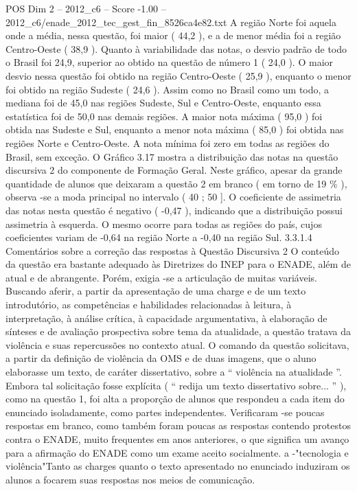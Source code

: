 \begin{textsample}{POS Dim 2 – 2012\_c6 – Score -1.00 – 2012\_c6/enade\_2012\_tec\_gest\_fin\_8526ca4e82.txt}
A região Norte foi aquela onde a média, nessa questão, foi maior ( 44,2 ), e a de menor média foi a região Centro-Oeste ( 38,9 ).
Quanto à variabilidade das notas, o desvio padrão de todo o Brasil foi 24,9, superior ao obtido na questão de número 1 ( 24,0 ).
O maior desvio nessa questão foi obtido na região Centro-Oeste ( 25,9 ), enquanto o menor foi obtido na região Sudeste ( 24,6 ).
Assim como no Brasil como um todo, a mediana foi de 45,0 nas regiões Sudeste, Sul e Centro-Oeste, enquanto essa estatística foi de 50,0 nas demais regiões.
A maior nota máxima ( 95,0 ) foi obtida nas Sudeste e Sul, enquanto a menor nota máxima ( 85,0 ) foi obtida nas regiões Norte e Centro-Oeste.
A nota mínima foi zero em todas as regiões do Brasil, sem exceção.
O Gráfico 3.17 mostra a distribuição das notas na questão discursiva 2 do componente de Formação Geral.
Neste gráfico, apesar da grande quantidade de alunos que deixaram a questão 2 em branco ( em torno de 19 \% ), observa -se a moda principal no intervalo ( 40 ; 50 ].
O coeficiente de assimetria das notas nesta questão é negativo ( -0,47 ), indicando que a distribuição possui assimetria à esquerda.
O mesmo ocorre para todas as regiões do país, cujos coeficientes variam de -0,64 na região Norte a -0,40 na região Sul. 3.3.1.4 Comentários sobre a correção das respostas à Questão Discursiva 2 O conteúdo da questão era bastante adequado às Diretrizes do INEP para o ENADE, além de atual e de abrangente.
Porém, exigia -se a articulação de muitas variáveis.
Buscando aferir, a partir da apresentação de uma charge e de um texto introdutório, as competências e habilidades relacionadas à leitura, à interpretação, à análise crítica, à capacidade argumentativa, à elaboração de sínteses e de avaliação prospectiva sobre tema da atualidade, a questão tratava da violência e suas repercussões no contexto atual.
O comando da questão solicitava, a partir da definição de violência da OMS e de duas imagens, que o aluno elaborasse um texto, de caráter dissertativo, sobre a “ violência na atualidade ”.
Embora tal solicitação fosse explícita ( “ redija um texto dissertativo sobre... ” ), como na questão 1, foi alta a proporção de alunos que respondeu a cada item do enunciado isoladamente, como partes independentes.
Verificaram -se poucas respostas em branco, como também foram poucas as respostas contendo protestos contra o ENADE, muito frequentes em anos anteriores, o que significa um avanço para a afirmação do ENADE como um exame aceito socialmente. a -"tecnologia e violência"Tanto as charges quanto o texto apresentado no enunciado induziram os alunos a focarem suas respostas nos meios de comunicação.

\end{textsample}
